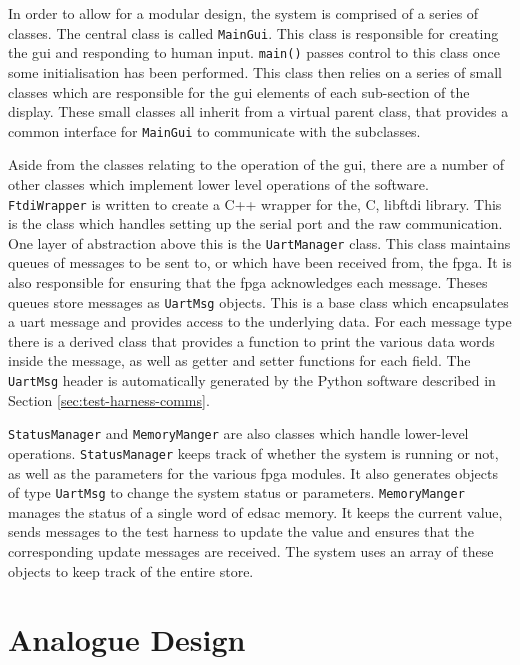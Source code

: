 In order to allow for a modular design, the system is comprised of a series of classes. The central class is called \texttt{MainGui}. This class is responsible for creating the \gls{gui} and responding to human input. \texttt{main()} passes control to this class once some initialisation has been performed. This class then relies on a series of small classes which are responsible for the \gls{gui} elements of each sub-section of the display. These small classes all inherit from a virtual parent class, that provides a common interface for \texttt{MainGui} to communicate with the subclasses.

Aside from the classes relating to the operation of the \gls{gui}, there are a number of other classes which implement lower level operations of the software. \texttt{FtdiWrapper} is written to create a C++ wrapper for the, C, libftdi library. This is the class which handles setting up the serial port and the raw communication. One layer of abstraction above this is the \texttt{UartManager} class. This class maintains queues of messages to be sent to, or which have been received from, the \gls{fpga}. It is also responsible for ensuring that the \gls{fpga} acknowledges each message. Theses queues store messages as \texttt{UartMsg} objects. This is a base class which encapsulates a \gls{uart} message and provides access to the underlying data. For each message type there is a derived class that provides a function to print the various data words inside the message, as well as getter and setter functions for each field. The \texttt{UartMsg} header is automatically generated by the Python software described in Section \ref{sec:test-harness-comms}.

\texttt{StatusManager} and \texttt{MemoryManger} are also classes which handle lower-level operations. \texttt{StatusManager} keeps track of whether the system is running or not, as well as the parameters for the various \gls{fpga} modules. It also generates objects of type \texttt{UartMsg} to change the system status or parameters. \texttt{MemoryManger} manages the status of a single word of \gls{edsac} memory. It keeps the current value, sends messages to the test harness to update the value and ensures that the corresponding update messages are received. The system uses an array of these objects to keep track of the entire store.

\section{Analogue Design}  \label{sec:test-harness-ana}

